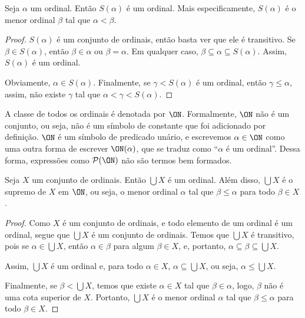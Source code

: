 \begin{proposition}[$\BST$]\label{prop:sucessorDeOrdinalEhOrdinal}
    Seja $\alpha$ um ordinal.
    Então $S(\alpha)$ é um ordinal.
    Mais especificamente, $S(\alpha)$ é o menor ordinal $\beta$ tal que $\alpha<\beta$.
\end{proposition}
\begin{proof}
    $S(\alpha)$ é um conjunto de ordinais, então basta ver que ele é transitivo.
    Se $\beta \in S(\alpha)$, então $\beta\in \alpha$ ou $\beta=\alpha$.
    Em qualquer caso, $\beta\subseteq \alpha\subseteq S(\alpha)$.
    Assim, $S(\alpha)$ é um ordinal.

    Obviamente, $\alpha \in S(\alpha)$.
    Finalmente, se $\gamma<S(\alpha)$ é um ordinal, então $\gamma\leq \alpha$, assim, não existe $\gamma$ tal que $\alpha<\gamma<S(\alpha)$.
\end{proof}

A classe de todos os ordinais é denotada por $\ON$.
Formalmente, $\ON$ não é um conjunto, ou seja, não é um símbolo de constante que foi adicionado por definição.
$\ON$ é um símbolo de predicado unário, e escrevemos $\alpha \in \ON$ como uma outra forma de escrever $\ON(\alpha)$, que se traduz como ``$\alpha$ é um ordinal''.
Dessa forma, expressões como $\mathcal P(\ON)$ não são termos bem formados.


\begin{lemma}[$\BST$]\label{lem:uniaoDeOrdinaisEhSupremo}
    Seja $X$ um conjunto de ordinais.
    Então $\bigcup X$ é um ordinal.
    Além disso, $\bigcup X$ é o supremo de $X$ em $\ON$, ou seja, o menor ordinal $\alpha$ tal que $\beta\leq \alpha$ para todo $\beta\in X$.
\end{lemma}
\begin{proof}
    Como $X$ é um conjunto de ordinais, e todo elemento de um ordinal é um ordinal, segue que $\bigcup X$ é um conjunto de ordinais.
    Temos que $\bigcup X$ é transitivo, pois se $\alpha \in \bigcup X$, então $\alpha\in \beta$ para algum $\beta\in X$, e, portanto, $\alpha\subseteq \beta\subseteq \bigcup X$.

    Assim, $\bigcup X$ é um ordinal e, para todo $\alpha \in X$, $\alpha\subseteq \bigcup X$, ou seja, $\alpha\leq \bigcup X$.

    Finalmente, se $\beta<\bigcup X$, temos que existe $\alpha \in X$ tal que $\beta\in \alpha$, logo, $\beta$ não é uma cota superior de $X$.
    Portanto, $\bigcup X$ é o menor ordinal $\alpha$ tal que $\beta\leq \alpha$ para todo $\beta\in X$.
\end{proof}

